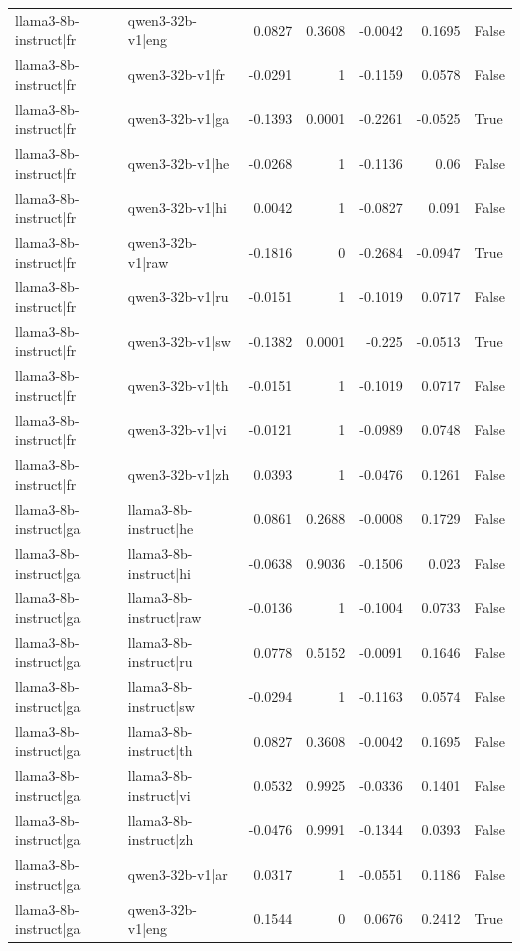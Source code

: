 \begin{table}
\begin{tabular}{l l r r r r l}
llama3-8b-instruct|fr & qwen3-32b-v1|eng & 0.0827 & 0.3608 & -0.0042 & 0.1695 & False \\
llama3-8b-instruct|fr & qwen3-32b-v1|fr & -0.0291 & 1 & -0.1159 & 0.0578 & False \\
llama3-8b-instruct|fr & qwen3-32b-v1|ga & -0.1393 & 0.0001 & -0.2261 & -0.0525 & True \\
llama3-8b-instruct|fr & qwen3-32b-v1|he & -0.0268 & 1 & -0.1136 & 0.06 & False \\
llama3-8b-instruct|fr & qwen3-32b-v1|hi & 0.0042 & 1 & -0.0827 & 0.091 & False \\
llama3-8b-instruct|fr & qwen3-32b-v1|raw & -0.1816 & 0 & -0.2684 & -0.0947 & True \\
llama3-8b-instruct|fr & qwen3-32b-v1|ru & -0.0151 & 1 & -0.1019 & 0.0717 & False \\
llama3-8b-instruct|fr & qwen3-32b-v1|sw & -0.1382 & 0.0001 & -0.225 & -0.0513 & True \\
llama3-8b-instruct|fr & qwen3-32b-v1|th & -0.0151 & 1 & -0.1019 & 0.0717 & False \\
llama3-8b-instruct|fr & qwen3-32b-v1|vi & -0.0121 & 1 & -0.0989 & 0.0748 & False \\
llama3-8b-instruct|fr & qwen3-32b-v1|zh & 0.0393 & 1 & -0.0476 & 0.1261 & False \\
llama3-8b-instruct|ga & llama3-8b-instruct|he & 0.0861 & 0.2688 & -0.0008 & 0.1729 & False \\
llama3-8b-instruct|ga & llama3-8b-instruct|hi & -0.0638 & 0.9036 & -0.1506 & 0.023 & False \\
llama3-8b-instruct|ga & llama3-8b-instruct|raw & -0.0136 & 1 & -0.1004 & 0.0733 & False \\
llama3-8b-instruct|ga & llama3-8b-instruct|ru & 0.0778 & 0.5152 & -0.0091 & 0.1646 & False \\
llama3-8b-instruct|ga & llama3-8b-instruct|sw & -0.0294 & 1 & -0.1163 & 0.0574 & False \\
llama3-8b-instruct|ga & llama3-8b-instruct|th & 0.0827 & 0.3608 & -0.0042 & 0.1695 & False \\
llama3-8b-instruct|ga & llama3-8b-instruct|vi & 0.0532 & 0.9925 & -0.0336 & 0.1401 & False \\
llama3-8b-instruct|ga & llama3-8b-instruct|zh & -0.0476 & 0.9991 & -0.1344 & 0.0393 & False \\
llama3-8b-instruct|ga & qwen3-32b-v1|ar & 0.0317 & 1 & -0.0551 & 0.1186 & False \\
llama3-8b-instruct|ga & qwen3-32b-v1|eng & 0.1544 & 0 & 0.0676 & 0.2412 & True \\

\end{tabular}
\end{table}
